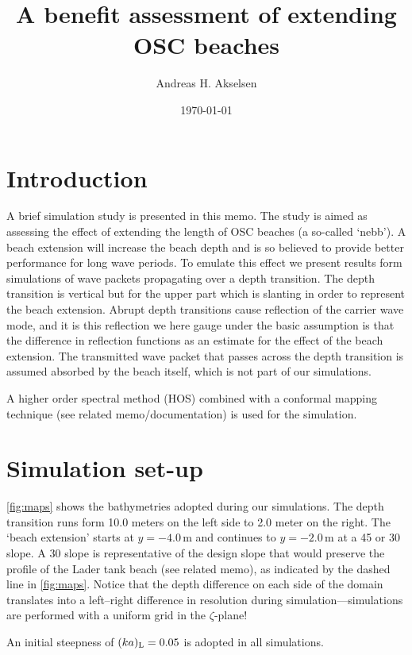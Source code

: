 \documentclass[internal]{sintefmemo}
\title{A benefit assessment of extending OSC beaches}
\author{Andreas H. Akselsen}
\date{\today}
\renewcommand{\_}[1]{_\mr{#1}}
\newcommand{\zz}{\zeta}
\begin{document}
\frontmatter


\section{Introduction}
A brief simulation study is presented in this memo. 
The study is aimed as assessing the effect of extending the length of OSC beaches (a so-called `nebb').
A beach extension will increase the beach depth and is so believed to provide better performance for long wave periods. 
To emulate this effect we present results form simulations of wave packets propagating over a depth transition.
The depth transition is vertical but for the upper part which is slanting in order to represent the beach extension. 
Abrupt depth transitions cause reflection of the carrier wave mode, and it is this reflection we here gauge
under the basic assumption is that the difference in reflection functions as an estimate for the effect of the beach extension.
The transmitted wave packet that passes across the depth transition is assumed absorbed by the beach itself, which is not part of our simulations.

A higher order spectral method (HOS) combined with a conformal mapping technique (see related memo/documentation) is used for the simulation.


\section{Simulation set-up}
\label{sec:setup}
\autoref{fig:maps} shows the bathymetries adopted during our simulations. 
The depth transition runs form 10.0 meters on the left side to 2.0 meter on the right.
The `beach extension' starts at $y=-4.0$\,m and continues to  $y=-2.0$\,m at a 45\textdegree{} or 30\textdegree{} slope.
A 30\textdegree{} slope is representative of the design slope that would preserve the profile of the Lader tank beach (see related memo), as indicated by the dashed line in \autoref{fig:maps}.
Notice that the depth difference on each side of the domain translates into a left--right difference in resolution during simulation---simulations are performed with a uniform grid in the $\zz$-plane!

An initial steepness of $(ka)\_L = 0.05$ is adopted in all simulations.
\end{document}
